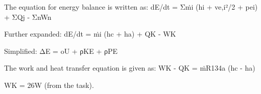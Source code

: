 The equation for energy balance is written as:  
dE/dt = Σṁi (hi + ve,i²/2 + pei) + ΣQj - ΣnWn  

Further expanded:  
dE/dt = ṁi (hc + ha) + QK - WK  

Simplified:  
ΔE = oU + ρKE + ρPE  

The work and heat transfer equation is given as:  
WK - QK = ṁR134a (hc - ha)  

WK = 26W (from the task).